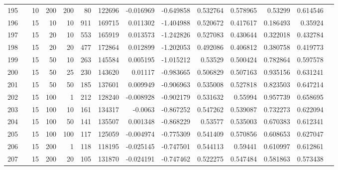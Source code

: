 \begin{longtable}{llrrrrrrrrrrrr}
		195 & &           10 &               200 &          200 &          80 &     122696 & -0.016969 & -0.649858 &  0.532764 &    0.578965 &        0.53299 &  0.614546 \\
		196 & &           15 &                10 &           10 &         911 &     169715 &  0.011302 & -1.404988 &  0.520672 &    0.417617 &       0.186493 &   0.35924 \\
		197 & &           15 &                20 &           10 &         553 &     165919 &  0.013573 & -1.242826 &  0.527083 &    0.430644 &       0.322018 &  0.432784 \\
		198 & &           15 &                20 &           20 &         477 &     172864 &  0.012899 & -1.202053 &  0.492086 &    0.406812 &       0.380758 &  0.419773 \\
		199 & &           15 &                50 &           10 &         263 &     145584 &  0.005195 & -1.015212 &   0.53529 &    0.500424 &       0.782864 &  0.597578 \\
		200 & &           15 &                50 &           25 &         230 &     143620 &   0.01117 & -0.983665 &  0.506829 &    0.507163 &       0.935156 &  0.631241 \\
		201 & &           15 &                50 &           50 &         185 &     137601 &  0.009949 & -0.906963 &  0.535008 &    0.527818 &       0.823503 &  0.647214 \\
		202 & &           15 &               100 &            1 &         212 &     128240 & -0.008928 & -0.902179 &  0.531632 &     0.55994 &       0.957739 &  0.658695 \\
		203 & &           15 &               100 &           10 &         161 &     134317 &   -0.0063 & -0.867252 &  0.547262 &    0.539087 &       0.732273 &  0.622094 \\
		204 & &           15 &               100 &           50 &         141 &     135507 &  0.001348 & -0.868229 &   0.53577 &    0.535003 &       0.670383 &  0.612341 \\
		205 & &           15 &               100 &          100 &         117 &     125059 & -0.004974 & -0.775309 &  0.541409 &    0.570856 &       0.608653 &  0.627047 \\
		206 & &           15 &               200 &            1 &         118 &     118195 & -0.025145 & -0.747501 &  0.544113 &     0.59441 &       0.610997 &  0.612861 \\
		207 & &           15 &               200 &           20 &         105 &     131870 & -0.024191 & -0.747462 &  0.522275 &    0.547484 &       0.581863 &  0.573438 \\

\end{longtable}
